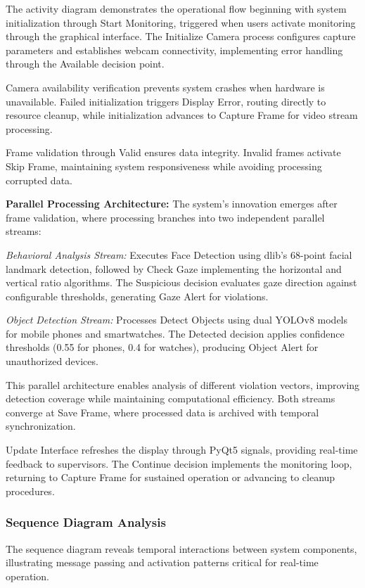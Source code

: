 \documentclass[conference]{IEEEtran}
\begin{document}
The activity diagram demonstrates the operational flow beginning with system 
initialization through Start Monitoring, triggered when users activate monitoring 
through the graphical interface. The Initialize Camera process configures capture 
parameters and establishes webcam connectivity, implementing error handling through 
the Available decision point.

Camera availability verification prevents system crashes 
when hardware is unavailable. Failed initialization triggers Display Error, 
routing directly to resource cleanup, while initialization advances to 
Capture Frame for video stream processing.

Frame validation through Valid ensures data integrity. Invalid frames 
activate Skip Frame, maintaining system responsiveness while avoiding processing 
corrupted data.

\textbf{Parallel Processing Architecture:} The system's innovation emerges after 
frame validation, where processing branches into two independent parallel streams:

\textit{Behavioral Analysis Stream:} Executes Face Detection using dlib's 68-point 
facial landmark detection, followed by Check Gaze implementing the horizontal 
and vertical ratio algorithms. The Suspicious decision evaluates gaze direction 
against configurable thresholds, generating Gaze Alert for violations.

\textit{Object Detection Stream:} Processes Detect Objects using 
dual YOLOv8 models for mobile phones and smartwatches. The Detected decision 
applies confidence thresholds (0.55 for phones, 0.4 for watches), producing Object Alert 
for unauthorized devices.

This parallel architecture enables analysis of different violation vectors, 
improving detection coverage while maintaining computational efficiency. 
Both streams converge at Save Frame, where processed data is archived with 
temporal synchronization.

Update Interface refreshes the display through PyQt5 signals, providing real-time 
feedback to supervisors. The Continue decision implements the monitoring loop, 
returning to Capture Frame for sustained operation or advancing to cleanup procedures.

\subsubsection{Sequence Diagram Analysis}

The sequence diagram reveals temporal interactions between system components, illustrating 
message passing and activation patterns critical for real-time operation.
\end{document}
